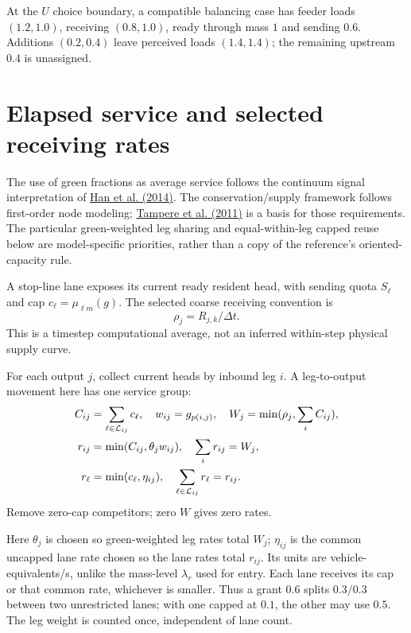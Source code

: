 \documentclass[10pt,a4paper]{article}
\begin{document}
At the $U$ choice boundary, a compatible balancing case has feeder loads
$(1.2,1.0)$, receiving $(0.8,1.0)$, ready through mass $1$ and sending $0.6$.
Additions $(0.2,0.4)$ leave perceived loads $(1.4,1.4)$;
the remaining upstream $0.4$ is unassigned.

\section{Elapsed service and selected receiving rates}


The use of green fractions as average service follows the continuum
signal interpretation of
\href{https://arxiv.org/abs/1309.3461}{Han et al. (2014)}.
The conservation/supply framework follows first-order node modeling;
\href{https://doi.org/10.1016/j.trb.2010.06.004}{Tampere et al. (2011)}
is a basis for those requirements. The particular green-weighted leg
sharing and equal-within-leg capped reuse below are model-specific
priorities, rather than a copy of the reference's oriented-capacity rule.
\par

A stop-line lane exposes its current ready resident head, with sending
quota $S_\ell$ and cap $c_\ell=\mu_{\ell m}(g)$.
The selected coarse receiving convention is
\begin{equation}
 \rho_j=R_{j,k}/\Delta t .
 \label{eq:receiving-rate}
\end{equation}
This is a timestep computational average, not an inferred within-step
physical supply curve.

For each output $j$, collect current heads by inbound leg $i$.
A leg-to-output movement here has one service group:
\begin{align}
 C_{ij}&=\sum_{\ell\in{\cal L}_{ij}}c_\ell,\quad
 w_{ij}=g_{p(i,j)},\quad W_j=\min(\rho_j,\sum_iC_{ij}),\nonumber\\
 r_{ij}&=\min(C_{ij},\theta_jw_{ij}),\quad
                    \sum_i r_{ij}=W_j,\label{eq:leg-sharing}\\
 r_\ell&=\min(c_\ell,\eta_{ij}),\quad
                    \sum_{\ell\in{\cal L}_{ij}}r_\ell=r_{ij}.
 \label{eq:lane-sharing}
\end{align}
Remove zero-cap competitors; zero $W$ gives zero rates.

Here $\theta_j$ is chosen so green-weighted leg rates total $W_j$;
$\eta_{ij}$ is the common uncapped lane rate chosen so the lane rates
total $r_{ij}$. Its units are vehicle-equivalents/s, unlike the mass-level
$\lambda_r$ used for entry. Each lane receives its cap or that common
rate, whichever is smaller. Thus a grant $0.6$ splits $0.3/0.3$ between
two unrestricted lanes; with one capped at $0.1$, the other may use $0.5$.
The leg weight is counted once, independent of lane count.
\par
\end{document}
